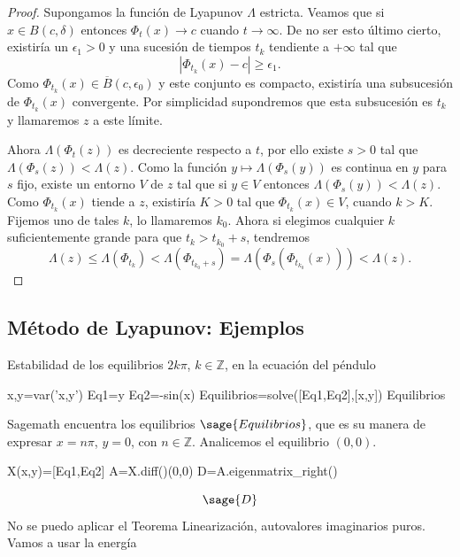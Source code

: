\begin{proof}
 
Supongamos la función de Lyapunov $\Lambda$ estricta. Veamos que si $x\in B(c,\delta)$ entonces 
$\Phi_t(x)\to c$ cuando $t\to\infty$. De no ser esto último cierto, existiría un 
$\epsilon_1>0$ y una sucesión de tiempos $t_k$ tendiente a $+\infty$ tal que
\[
 |\Phi_{t_k}(x)-c|\geq \epsilon_1.
\]
Como $\Phi_{t_k}(x)\in \overline{B}(c,\epsilon_0)$ y este conjunto es compacto, existiría una subsucesión de $\Phi_{t_k}(x)$
convergente. Por simplicidad supondremos que esta subsucesión es $t_k$ y llamaremos $z$ a este límite. 

 
 
Ahora $\Lambda(\Phi_t(z))$ es decreciente respecto a $t$, por ello existe $s>0$ tal que $\Lambda(\Phi_s(z))<\Lambda(z)$. Como
la función $y \mapsto \Lambda(\Phi_s(y))$ es continua en $y$ para $s$ fijo, existe un entorno $V$ de $z$ tal que si 
$y\in V$ entonces $\Lambda(\Phi_s(y))<\Lambda(z)$. Como  $\Phi_{t_k}(x)$ tiende a $z$, existiría $K>0$ tal que 
$\Phi_{t_k}(x)\in V$, cuando $k>K$. Fijemos uno de tales $k$, lo llamaremos $k_0$. Ahora si elegimos cualquier $k$
suficientemente grande para que $t_k>t_{k_0}+s$, tendremos
\[\Lambda(z)\leq \Lambda(\Phi_{t_k})<\Lambda(\Phi_{t_{k_0}+s})=\Lambda(\Phi_s(\Phi_{t_{k_0}}(x)))<\Lambda(z).\]


\end{proof}




\subsection{Método de Lyapunov: Ejemplos}

\begin{ejemplo} Estabilidad de los equilibrios $2k\pi$, $k\in\mathbb{Z}$, en la ecuación del péndulo

\end{ejemplo}
 \begin{sageblock}
x,y=var('x,y')
Eq1=y
Eq2=-sin(x)
Equilibrios=solve([Eq1,Eq2],[x,y])
Equilibrios
\end{sageblock}
Sagemath encuentra los equilibrios $\sage{Equilibrios}$, que es su manera de expresar $x=n\pi$, $y=0$, con $n\in\mathbb{Z}$. Analicemos el equilibrio $(0,0)$. 

\begin{sageblock}
X(x,y)=[Eq1,Eq2]
A=X.diff()(0,0)
D=A.eigenmatrix_right()
\end{sageblock}

\[\sage{D}\]
No  se puedo aplicar el Teorema Linearización, autovalores imaginarios puros. Vamos a usar la energía

